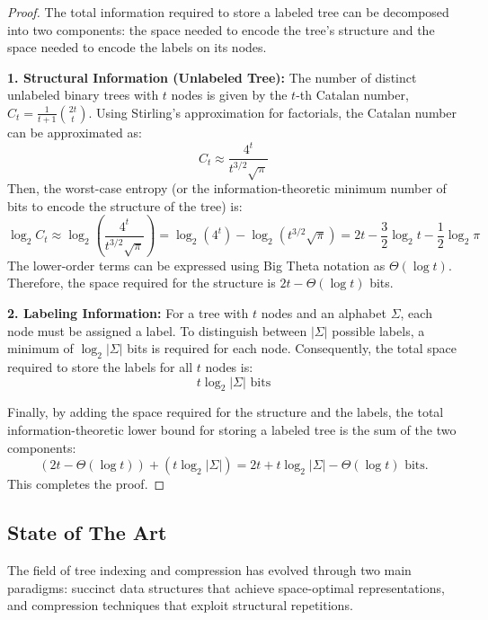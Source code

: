 \begin{proof}
The total information required to store a labeled tree can be decomposed into two components: the space needed to encode the tree's structure and the space needed to encode the labels on its nodes.

\textbf{1. Structural Information (Unlabeled Tree):}
The number of distinct unlabeled binary trees with $t$ nodes is given by the $t$-th Catalan number, $C_t = \frac{1}{t+1} \binom{2t}{t}$. Using Stirling's approximation for factorials, the Catalan number can be approximated as:
$$C_t \approx \frac{4^t}{t^{3/2}\sqrt{\pi}}$$
Then, the worst-case entropy (or the information-theoretic minimum number of bits to encode
the structure of the tree) is:
$$\log_2 C_t \approx \log_2\left(\frac{4^t}{t^{3/2}\sqrt{\pi}}\right) = \log_2(4^t) - \log_2(t^{3/2}\sqrt{\pi}) = 2t - \frac{3}{2}\log_2 t - \frac{1}{2}\log_2 \pi$$
The lower-order terms can be expressed using Big Theta notation as $\Theta(\log t)$. Therefore, the space required for the structure is $2t - \Theta(\log t)$ bits.

\textbf{2. Labeling Information:}
For a tree with $t$ nodes and an alphabet $\Sigma$, each node must be assigned a label. To distinguish between $|\Sigma|$ possible labels, a minimum of $\log_2 |\Sigma|$ bits is required for each node. Consequently, the total space required to store the labels for all $t$ nodes is:
$$t \log_2 |\Sigma| \text{ bits}$$

Finally, by adding the space required for the structure and the labels, the total information-theoretic lower bound for storing a labeled tree is the sum of the two components:
$$ (2t - \Theta(\log t)) + (t \log_2 |\Sigma|) = 2t + t \log_2 |\Sigma| - \Theta(\log t) \text{ bits.} $$
This completes the proof.
\end{proof}


\subsection{State of The Art} \label{sec:background}

The field of tree indexing and compression has evolved through two main paradigms: succinct data structures that achieve space-optimal representations, and compression techniques that exploit structural repetitions.

